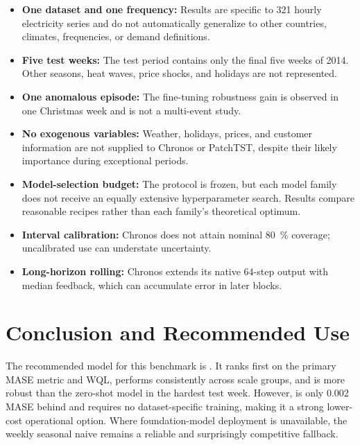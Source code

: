 \documentclass[11pt,a4paper]{article}
\newcommand{\code}[1]{\texttt{\detokenize{#1}}}
\begin{document}
\begin{itemize}
  \item \textbf{One dataset and one frequency:} Results are specific to 321 hourly electricity
  series and do not automatically generalize to other countries, climates, frequencies, or demand
  definitions.
  \item \textbf{Five test weeks:} The test period contains only the final five weeks of 2014. Other
  seasons, heat waves, price shocks, and holidays are not represented.
  \item \textbf{One anomalous episode:} The fine-tuning robustness gain is observed in one Christmas
  week and is not a multi-event study.
  \item \textbf{No exogenous variables:} Weather, holidays, prices, and customer information are not
  supplied to Chronos or PatchTST, despite their likely importance during exceptional periods.
  \item \textbf{Model-selection budget:} The protocol is frozen, but each model family does not
  receive an equally extensive hyperparameter search. Results compare reasonable recipes rather
  than each family's theoretical optimum.
  \item \textbf{Interval calibration:} Chronos does not attain nominal \SI{80}{\percent} coverage;
  uncalibrated use can understate uncertainty.
  \item \textbf{Long-horizon rolling:} Chronos extends its native 64-step output with median
  feedback, which can accumulate error in later blocks.
\end{itemize}

\section{Conclusion and Recommended Use}

The recommended model for this benchmark is \code{chronos_bolt_base_ft}. It ranks first on the
primary MASE metric and WQL, performs consistently across scale groups, and is more robust than the
zero-shot model in the hardest test week. However, \code{chronos_bolt_base} is only 0.002 MASE
behind and requires no dataset-specific training, making it a strong lower-cost operational option.
Where foundation-model deployment is unavailable, the weekly seasonal naive remains a reliable and
surprisingly competitive fallback.
\end{document}
